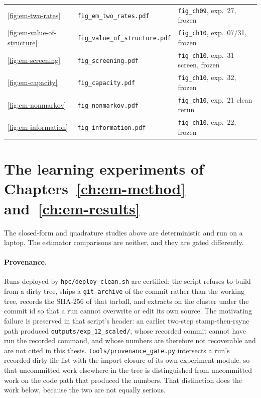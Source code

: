\begin{center}
\begin{minipage}{\linewidth}
\begin{tabular}{@{}lll@{}}
\ref{fig:em-two-rates} & \texttt{fig\_em\_two\_rates.pdf} & \texttt{fig\_ch09}, exp.~27, frozen \\
\ref{fig:em-value-of-structure} & \texttt{fig\_value\_of\_structure.pdf} & \texttt{fig\_ch10}, exp.~07/31, frozen \\
\ref{fig:em-screening} & \texttt{fig\_screening.pdf} & \texttt{fig\_ch10}, exp.~31 screen, frozen \\
\ref{fig:em-capacity} & \texttt{fig\_capacity.pdf} & \texttt{fig\_ch10}, exp.~32, frozen \\
\ref{fig:em-nonmarkov} & \texttt{fig\_nonmarkov.pdf} & \texttt{fig\_ch10}, exp.~21 clean rerun \\
\ref{fig:em-information} & \texttt{fig\_information.pdf} & \texttt{fig\_ch10}, exp.~22, frozen \\
\bottomrule
\end{tabular}
\end{minipage}
\end{center}

\section[The learning experiments]{The learning experiments of
Chapters~\ref{ch:em-method} and~\ref{ch:em-results}}\label{sec:repro-learning}

The closed-form and quadrature studies above are deterministic and run on a
laptop. The estimator comparisons are neither, and they are gated
differently.

\paragraph{Provenance.} Runs deployed by \texttt{hpc/deploy\_clean.sh} are
certified: the script refuses to build from a dirty tree, ships a
\texttt{git archive} of the commit rather than the working tree, records the
SHA-256 of that tarball, and extracts on the cluster under the commit id so that
a run cannot overwrite or edit its own source. The motivating failure is
preserved in that script's header: an earlier two-step stamp-then-rsync path
produced \texttt{outputs/exp\_12\_scaled/}, whose recorded commit cannot have
run the recorded command, and whose numbers are therefore not recoverable and
are not cited in this thesis. \texttt{tools/provenance\_gate.py} intersects a
run's recorded dirty-file list with the import closure of its own experiment
module, so that uncommitted work elsewhere in the tree is distinguished from
uncommitted work on the code path that produced the numbers. That distinction
does the work below, because the two are not equally serious.

